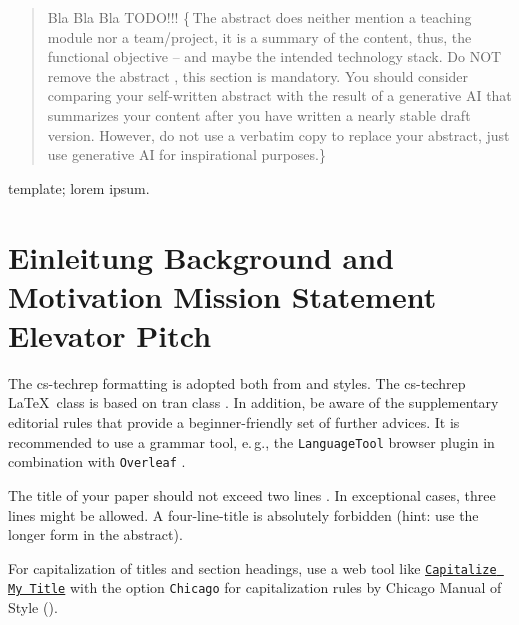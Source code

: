 \documentclass[conference,a4paper]{cs-techrep}
\begin{document}
\selectlanguage{\cstechrepLang}

\maketitle

\begin{abstract}
Bla Bla Bla TODO!!!
\{\,\faWarning{}The abstract does neither mention a teaching module nor a team/project,
it is a summary of the content, thus, the functional objective -- and maybe the intended technology stack.
Do NOT remove the abstract \faWarning{}, this section is mandatory.
You should consider comparing your self-written abstract with the result of a generative AI that summarizes your content after you have written a nearly stable draft version. However, do not use a verbatim copy to replace your abstract, just use generative AI for inspirational purposes.\}
\end{abstract}

\begin{IEEEkeywords}
template; lorem ipsum.
\end{IEEEkeywords}

\section{Einleitung \textbar{} Background and Motivation \textbar{} Mission Statement \textbar{} Elevator Pitch}

The cs-techrep formatting is adopted both from  \cite{ieee2018formattingrules} and  \cite{iaria2014formattingrules} styles.
The cs-techrep \LaTeX\ class is based on tran class \cite{ieee2015howto}.
In addition, be aware of the supplementary  editorial rules \cite{iaria2009editorialrules} \faWarning{} that provide a beginner-friendly set of further advices.
It is recommended to use a grammar tool, e.\,g., the \texttt{LanguageTool} \cite{languagetool} browser plugin in combination with \texttt{Overleaf} \cite{overleaf}.

The title of your paper should not exceed two lines \faWarning{}. In exceptional cases, three lines might be allowed. A four-line-title is absolutely forbidden (hint: use the longer form in the abstract).

For capitalization of titles and section headings, use a web tool like \href{https://capitalizemytitle.com/style/Chicago/}{\texttt{Capitalize My Title}} \faWarning{} with the option \texttt{Chicago} for capitalization rules by Chicago Manual of Style ().
\end{document}
